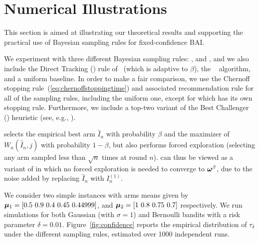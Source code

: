 \section{Numerical Illustrations}\label{sec:t3c.experiments}
This section is aimed at illustrating our theoretical results and supporting the practical use of Bayesian sampling rules for fixed-confidence BAI.   %

We experiment with three different Bayesian sampling rules: \TCC, \TTTS and \TTEI, and we also include the Direct Tracking (\DT) rule of~\cite{garivier2016tracknstop} (which is adaptive to $\beta$), the \UGapE~\citep{gabillon2012ugape} algorithm, and a uniform baseline. In order to make a fair comparison, we use the Chernoff stopping rule~(\ref{eq:chernoffstoppingtime}) and associated recommendation rule for all of the sampling rules, including the uniform one, except for \UGapE which has its own stopping rule. Furthermore, we include a top-two variant of the Best Challenger (\BC) heuristic (see, e.g., \citealp{menard2019lma}). 

\BC selects the empirical best arm $\hat{I}_n$ with probability $\beta$ and the maximizer of $W_n(\hat{I}_n,j)$ with probability $1-\beta$, but also performs forced exploration (selecting any arm sampled less than $\sqrt{n}$ times at round $n$). \TCC can thus be viewed as a variant of \BC in which no forced exploration is needed to converge to ${\boldsymbol \omega}^\beta$, due to the noise added by replacing $\hat{I}_n$ with $I_n^{(1)}$.

We consider two simple instances with arms means given by $\bmu_1 = [0.5 \ 0.9 \ 0.4 \ 0.45 \ 0.44999]$, and $\bmu_2 = [1 \ 0.8 \ 0.75 \ 0.7]$ respectively. We run simulations for both Gaussian (with $\sigma=1$) and Bernoulli bandits with a risk parameter $\delta=0.01$. %
Figure~\ref{fig:confidence} reports the empirical distribution of $\tau_\delta$ under the different sampling rules, estimated over 1000 independent runs. 

